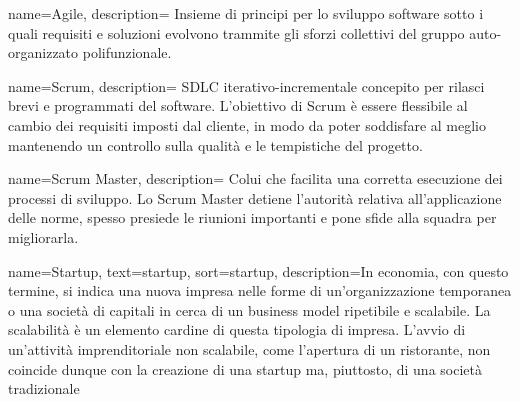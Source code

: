  {
name=Agile,
description={
Insieme di principi per lo sviluppo software sotto i quali requisiti e
soluzioni evolvono trammite gli sforzi collettivi del gruppo auto-organizzato
polifunzionale.
}
}

 {
name=Scrum,
description={
SDLC iterativo-incrementale concepito per rilasci brevi e programmati del
software. L'obiettivo di Scrum è essere flessibile al cambio dei requisiti
imposti dal cliente, in modo da poter soddisfare al meglio mantenendo un
controllo sulla qualità e le tempistiche del progetto.
}
}

 {
name=Scrum Master,
description={
Colui che facilita una corretta esecuzione dei processi di sviluppo. Lo Scrum
Master detiene l'autorità relativa all'applicazione delle norme, spesso
presiede le riunioni importanti e pone sfide alla squadra per migliorarla.
}
}

{
    name=Startup,
    text=startup,
    sort=startup,
    description={In economia, con questo termine, si indica una nuova impresa
nelle forme di un'organizzazione temporanea o una società di capitali in cerca
di un business model ripetibile e scalabile.
La scalabilità è un elemento cardine di questa tipologia di impresa. L'avvio di
un'attività imprenditoriale non scalabile, come l'apertura di un ristorante,
non coincide dunque con la creazione di una startup ma, piuttosto, di una
società tradizionale}
}

